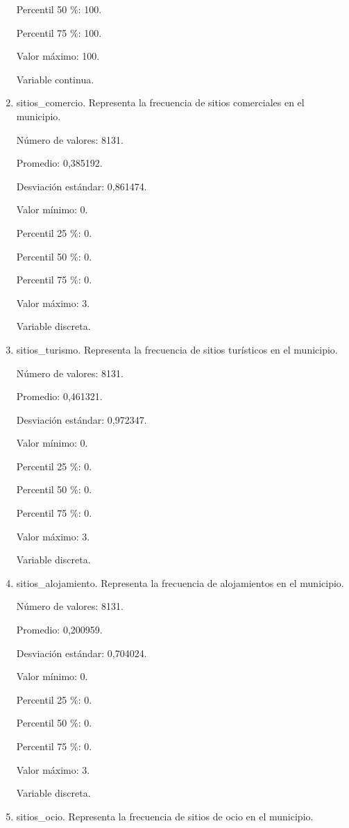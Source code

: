 \begin{enumerate}
	Percentil 50 \%: 100.
	
	Percentil 75 \%: 100.
	
	Valor máximo: 100.
	
	Variable continua.

	\item sitios\_comercio. Representa la frecuencia de sitios comerciales en el municipio.
	
	Número de valores: 8131.
	
	Promedio: 0,385192.
	
	Desviación estándar: 0,861474.
	
	Valor mínimo: 0.
	
	Percentil 25 \%: 0.
	
	Percentil 50 \%: 0.
	
	Percentil 75 \%: 0.
	
	Valor máximo: 3.
	
	Variable discreta.

	\item sitios\_turismo. Representa la frecuencia de sitios turísticos en el municipio.
	
	Número de valores: 8131.
	
	Promedio: 0,461321.
	
	Desviación estándar: 0,972347.
	
	Valor mínimo: 0.
	
	Percentil 25 \%: 0.
	
	Percentil 50 \%: 0.
	
	Percentil 75 \%: 0.
	
	Valor máximo: 3.
	
	Variable discreta.

	\item sitios\_alojamiento. Representa la frecuencia de alojamientos en el municipio.
	
	Número de valores: 8131.
	
	Promedio: 0,200959.
	
	Desviación estándar: 0,704024.
	
	Valor mínimo: 0.
	
	Percentil 25 \%: 0.
	
	Percentil 50 \%: 0.
	
	Percentil 75 \%: 0.
	
	Valor máximo: 3.
	
	Variable discreta.

	\item sitios\_ocio. Representa la frecuencia de sitios de ocio en el municipio.
	

\end{enumerate}
